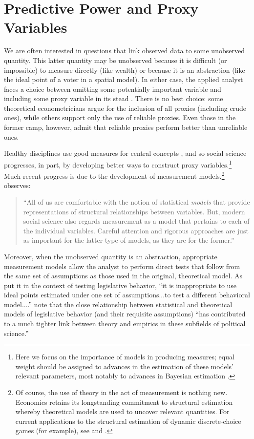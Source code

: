 \section{Predictive Power and Proxy Variables}

We are often interested in questions that link observed data to some unobserved quantity.
This latter quantity may be unobserved because it is difficult (or impossible) to measure directly (like wealth) or because it is an abstraction (like the ideal point of a voter in a spatial model).
In either case, the applied analyst faces a choice between omitting some potentially important variable and including some proxy variable in its stead \citep{stahlecker1993}.
There is no best choice: some theoretical econometricians \citep[e.g.][]{mccallum1972} argue for the inclusion of all proxies (including crude ones), while others \citep[e.g.][]{maddala1977} support only the use of reliable proxies.
Even those in the former camp, however, admit that reliable proxies perform better than unreliable ones.

Healthy disciplines use good measures for central concepts \citep{kuhn1977}, and so social science progresses, in part, by developing better ways to construct proxy variables.\footnote{Here we focus on the importance of models in producing measures; equal weight should be assigned to advances in the estimation of these models' relevant parameters, most notably to advances in Bayesian estimation \citep{jackman2001,martin2002,clinton2004,bafumi2005}.}
Much recent progress is due to the development of measurement models.\footnote{Of course, the use of theory in the act of measurement is nothing new.
  Economics retains its longstanding commitment to structural estimation whereby theoretical models are used to uncover relevant quantities.
  For current applications to the structural estimation of dynamic discrete-choice games (for example), see \citet{su2012} and \citet{egesdal2013}.} \citet[2]{jacoby2014} observes:
\begin{quote}
  ``All of us are comfortable with the notion of statistical \emph{models} that provide representations of structural relationships between variables.  But, modern social science also regards measurement as a model that pertains to each of the individual variables.  Careful attention and rigorous approaches are just as important for the latter type of models, as they are for the former.''
\end{quote}
Moreover, when the unobserved quantity is an abstraction, appropriate measurement models allow the analyst to perform direct tests that follow from the same set of assumptions as those used in the original, theoretical model.
As \citet[355]{clinton2004} put it in the context of testing legislative behavior, ``it is inappropriate to use ideal points estimated under one set of assumptions...to test a different behavioral model....''  \citet[530]{shor2011} note that the close relationship between statistical and theoretical models of legislative behavior (and their requisite assumptions) ``has contributed to a much tighter link between theory and empirics in these subfields of political science.''  

